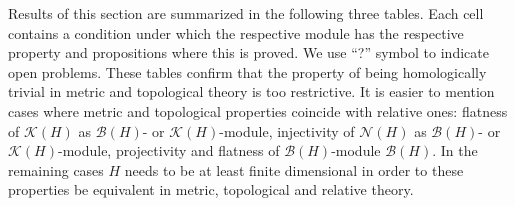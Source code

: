 Results of this section are summarized in the following three tables. Each cell
contains a condition under which the respective module has the respective
property and propositions where this is proved. We use ``?'' symbol to indicate
open problems. These tables confirm that the property of being homologically
trivial in metric and topological theory is too restrictive. It is easier to
mention cases where metric and topological properties coincide with relative
ones: flatness of $\mathcal{K}(H)$ as $\mathcal{B}(H)$- or
$\mathcal{K}(H)$-module, injectivity of $\mathcal{N}(H)$ as $\mathcal{B}(H)$- or
$\mathcal{K}(H)$-module, projectivity and flatness of $\mathcal{B}(H)$-module
$\mathcal{B}(H)$. In the remaining cases $H$ needs to be at least finite
dimensional in order to these properties be equivalent in metric, topological
and relative theory.


